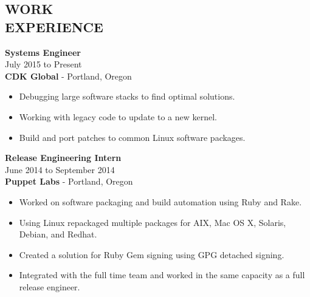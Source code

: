 \documentclass[mm]{res}
\begin{document}
\begin{resume}
\section{WORK \\ EXPERIENCE}  
	\textbf{Systems Engineer} \\
	July 2015 to Present \\
	\textbf{CDK Global} - Portland, Oregon \\
\begin{itemize}
	\item Debugging large software stacks to find optimal solutions.
	\item Working with legacy code to update to a new kernel.
	\item Build and port patches to common Linux software packages.
\end{itemize}
	\textbf{Release Engineering Intern} \\
	June 2014 to September 2014 \\
	\textbf{Puppet Labs} - Portland, Oregon \\
\begin{itemize} \parskip0pt  \itemsep-8pt
	\item Worked on software packaging and build automation using Ruby and Rake. \\
	\item Using Linux repackaged multiple packages for AIX, Mac OS X, Solaris, Debian, and Redhat. \\
	\item Created a solution for Ruby Gem signing using GPG detached signing. \\
	\item Integrated with the full time team and worked in the same capacity as a full release engineer. \\
\end{itemize}


\end{resume}
\end{document}
